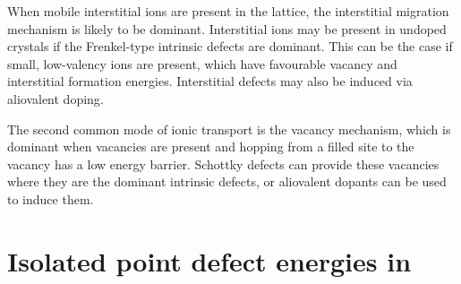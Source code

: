 \documentclass[12pt]{report}
\begin{document}
When mobile interstitial ions are present in the lattice, the interstitial migration mechanism is likely to be dominant.
Interstitial ions may be present in undoped crystals if the Frenkel-type intrinsic defects are dominant.
This can be the case if small, low-valency ions are present, which have favourable vacancy and interstitial formation energies.
Interstitial defects may also be induced via aliovalent doping.

The second common mode of ionic transport is the vacancy mechanism, which is dominant when vacancies are present and hopping from a filled site to the vacancy has a low energy barrier.
Schottky defects can provide these vacancies where they are the dominant intrinsic defects, or aliovalent dopants can be used to induce them.





\chapter{Isolated point defect energies in }
\end{document}
